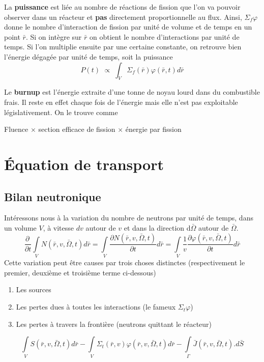 La \textbf{puissance} est liée au nombre de réactions de fission que l'on va pouvoir observer dans 
un réacteur et \textbf{pas} directement proportionnelle au flux. Ainsi, $\Sigma_f\varphi$ donne 
le nombre d'interaction de fission par unité de volume et de temps en un point $\bar r$. Si on intègre 
sur $\bar r$ on obtient le nombre d'interactions par unité de temps. Si l'on multiplie ensuite par une 
certaine constante, on retrouve bien l'énergie dégagée par unité de temps, soit la puissance
\begin{equation}
P(t)\,\, \propto \;\int_V^{} {{\Sigma _f}(\bar r)\varphi } (\bar r,t)d\bar r
\end{equation}

Le \textbf{burnup} est l'énergie extraite d'une tonne de noyau lourd dans du combustible frais. Il 
reste en effet chaque fois de l'énergie mais elle n'est pas exploitable législativement. On le 
trouve comme
\begin{center}
Fluence $\times$ section efficace de fission $\times$ énergie par fission
\end{center}


\section{Équation de transport}
\subsection{Bilan neutronique}
Intéressons nous à la variation du nombre de neutrons par unité de temps, dans un volume $V$, à 
vitesse $dv$ autour de $v$ et dans la direction d$\bar\Omega$ autour de $\bar \Omega$.
\begin{equation}
\frac{{\partial \,}}{{\partial t}}\int\limits_V    N(\bar r,v,\bar \Omega ,t)d\bar r = \int\limits_V    \frac{{\partial N(\bar r,v,\bar \Omega ,t)}}{{\partial t}}d\bar r = \int\limits_V    \frac{1}{v}\frac{{\partial \varphi (\bar r,v,\bar \Omega ,t)}}{{\partial t}}d\bar r
\end{equation} 
Cette variation peut être causes par trois choses distinctes (respectivement le premier, deuxième 
et troisième terme ci-dessous)
\begin{enumerate}
\item Les sources
\item Les pertes dues à toutes les interactions (le fameux $\Sigma_t\varphi$)
\item Les pertes à travers la frontière (neutrons quittant le réacteur)
\end{enumerate}
\begin{equation}
\int\limits_V    S(\bar r,v,\bar \Omega ,t)d\bar r - \int\limits_V    {\Sigma _t}(\bar r,v)\varphi (\bar r,v,\bar \Omega ,t)d\bar r  - \int\limits_\Gamma     \bar J(\bar r,v,\bar \Omega ,t).d\bar S
\end{equation}
\newpage

